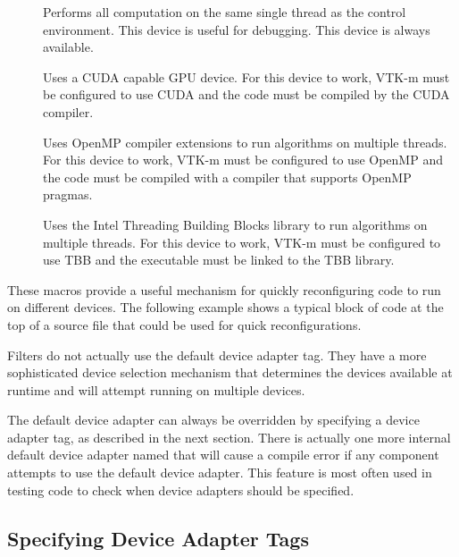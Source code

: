 \begin{description}
\item[] Performs all computation on
  the same single thread as the control environment. This device is useful
  for debugging. This device is always available.
\item[] Uses a CUDA capable GPU
  device. For this device to work, VTK-m must be configured to use CUDA and
  the code must be compiled by the CUDA  compiler.
\item[] Uses OpenMP compiler
  extensions to run algorithms on multiple threads. For this device to
  work, VTK-m must be configured to use OpenMP and the code must be
  compiled with a compiler that supports OpenMP pragmas. 
\item[] Uses the Intel Threading
  Building Blocks library to run algorithms on multiple threads. For this
  device to work, VTK-m must be configured to use TBB and the executable
  must be linked to the TBB library.
\end{description}

These macros provide a useful mechanism for quickly reconfiguring code to
run on different devices. The following example shows a typical block of
code at the top of a source file that could be used for quick
reconfigurations.


\begin{didyouknow}
  Filters do not actually use the default device adapter tag. They have a
  more sophisticated device selection mechanism that determines the devices
  available at runtime and will attempt running on multiple devices.
\end{didyouknow}

The default device adapter can always be overridden by specifying a device
adapter tag, as described in the next section. There is actually one more
internal default device adapter named
 that will cause a compile error if
any component attempts to use the default device adapter. This feature is
most often used in testing code to check when device adapters should be
specified.

\subsection{Specifying Device Adapter Tags}

